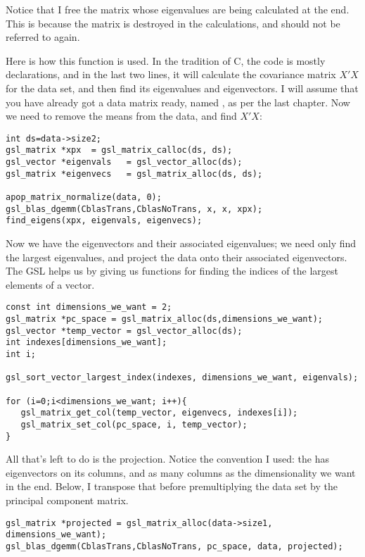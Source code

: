 Notice that I free the matrix whose eigenvalues are being calculated at the end.
This is because the matrix is destroyed in the
calculations, and should not be referred to again. 

Here is how this function is used. In the tradition of C, the code is
mostly declarations, and in the last two lines, it will calculate the
covariance matrix $X'X$ for the data set, and then find its eigenvalues
and eigenvectors.  
I will assume that you have already got a data matrix ready, named
, as per the last chapter. Now we need to remove the means
from the data, and find $X'X$:

\begin{lstlisting}
int ds=data->size2;
gsl_matrix *xpx  = gsl_matrix_calloc(ds, ds);
gsl_vector *eigenvals   = gsl_vector_alloc(ds);
gsl_matrix *eigenvecs   = gsl_matrix_alloc(ds, ds);

apop_matrix_normalize(data, 0);
gsl_blas_dgemm(CblasTrans,CblasNoTrans, x, x, xpx);
find_eigens(xpx, eigenvals, eigenvecs);
\end{lstlisting}

Now we have the eigenvectors and their associated eigenvalues; we need only find
the largest eigenvalues, and project the data onto their associated eigenvectors.
The GSL helps us by giving us functions for
finding the indices of the largest elements of a vector.
\begin{lstlisting}
const int dimensions_we_want = 2;
gsl_matrix *pc_space = gsl_matrix_alloc(ds,dimensions_we_want);
gsl_vector *temp_vector = gsl_vector_alloc(ds);
int indexes[dimensions_we_want];
int i;

gsl_sort_vector_largest_index(indexes, dimensions_we_want, eigenvals);

for (i=0;i<dimensions_we_want; i++){
   gsl_matrix_get_col(temp_vector, eigenvecs, indexes[i]);
   gsl_matrix_set_col(pc_space, i, temp_vector);
}
\end{lstlisting}

All that's left to do is the projection. Notice the convention I used:
the  has eigenvectors on its columns, and as many columns as the
dimensionality we want in the end. Below, I transpose that before premultiplying
the data set by the principal component matrix.

\begin{lstlisting}
gsl_matrix *projected = gsl_matrix_alloc(data->size1, dimensions_we_want);
gsl_blas_dgemm(CblasTrans,CblasNoTrans, pc_space, data, projected);
\end{lstlisting}

